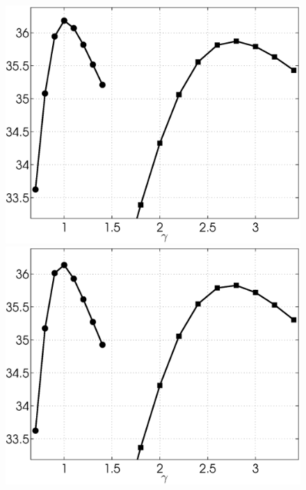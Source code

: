\documentclass{ipol}
\begin{document}
\begin{figure}[ht!]
	\includegraphics[width=.33\textwidth]{f/nldct/STH1bay-vs-HTH1ctn_bpsnr_np2-g-curves_1np040_s10_average.eps}%
	\includegraphics[width=.33\textwidth]{f/nldct/STH1bay-vs-HTH1ctn_bpsnr_np2-g-curves_1np100_s10_average.eps}\\
                                                                   

\end{figure}
\end{document}
